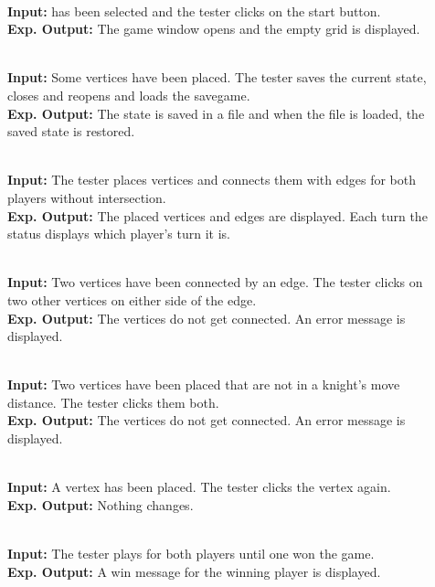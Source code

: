 \begin{description}
	\item[] \textbf{} \\
	\textbf{Input:} \twixt has been selected and the tester clicks on the start button. \\
	\textbf{Exp. Output:} The game window opens and the empty grid is displayed.
	
	\item[] \textbf{} \\
	\textbf{Input:} Some vertices have been placed. The tester saves the current state, closes and reopens \twixt and loads the savegame. \\
	\textbf{Exp. Output:} The state is saved in a file and when the file is loaded, the saved state is restored.
	
	\item[] \textbf{} \\
	\textbf{Input:} The tester places vertices and connects them with edges for both players without intersection. \\
	\textbf{Exp. Output:} The placed vertices and edges are displayed. Each turn the status displays which player's turn it is.
	
	\item[] \textbf{} \\
	\textbf{Input:} Two vertices have been connected by an edge. The tester clicks on two other vertices on either side of the edge. \\
	\textbf{Exp. Output:} The vertices do not get connected. An error message is displayed.
	
	\item[] \textbf{} \\
	\textbf{Input:} Two vertices have been placed that are not in a knight's move distance. The tester clicks them both. \\
	\textbf{Exp. Output:} The vertices do not get connected. An error message is displayed.
	
	\item[] \textbf{} \\
	\textbf{Input:} A vertex has been placed. The tester clicks the vertex again. \\
	\textbf{Exp. Output:} Nothing changes.
	
	\item[] \textbf{} \\
	\textbf{Input:} The tester plays for both players until one won the game. \\
	\textbf{Exp. Output:} A win message for the winning player is displayed.
\end{description}

